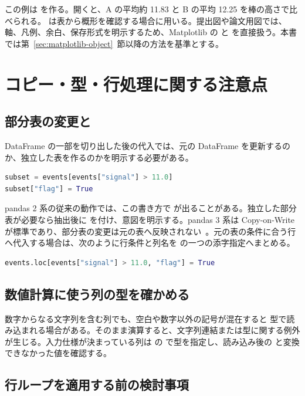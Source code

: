 この例は  を作る。開くと、A の平均約 11.83 と B の平均 12.25 を棒の高さで比べられる。 は表から概形を確認する場合に用いる。提出図や論文用図では、軸、凡例、余白、保存形式を明示するため、Matplotlib の  と  を直接扱う。本書では第~\ref{sec:matplotlib-object}~節以降の方法を基準とする。

\section{コピー・型・行処理に関する注意点}

\subsection{部分表の変更と }

DataFrame の一部を切り出した後の代入では、元の DataFrame を更新するのか、独立した表を作るのかを明示する必要がある。

\begin{lstlisting}[language=Python]
subset = events[events["signal"] > 11.0]
subset["flag"] = True
\end{lstlisting}

pandas 2 系の従来の動作では、この書き方で  が出ることがある。独立した部分表が必要なら抽出後に  を付け、意図を明示する。pandas 3 系は Copy-on-Write が標準であり、部分表の変更は元の表へ反映されない~\cite{pandas_cow}。元の表の条件に合う行へ代入する場合は、次のように行条件と列名を  の一つの添字指定へまとめる。

\begin{lstlisting}[language=Python]
events.loc[events["signal"] > 11.0, "flag"] = True
\end{lstlisting}

\subsection{数値計算に使う列の型を確かめる}

数字からなる文字列を含む列でも、空白や数字以外の記号が混在すると  型で読み込まれる場合がある。そのまま演算すると、文字列連結または型に関する例外が生じる。入力仕様が決まっている列は  の  で型を指定し、読み込み後の  と変換できなかった値を確認する。

\subsection{行ループを適用する前の検討事項}

